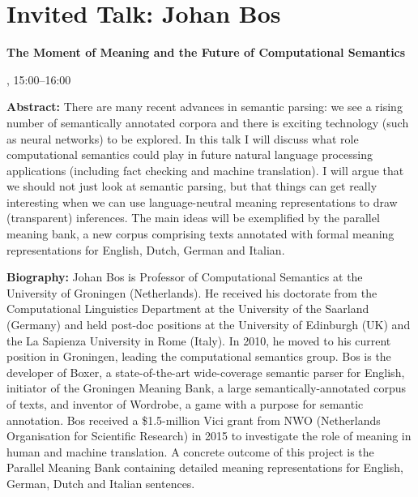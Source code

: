 \section{Invited Talk: Johan Bos}

\begin{center}
\begin{Large}
    {\bfseries\Large The Moment of Meaning and the Future of Computational Semantics} 
\vspace{1em}\par
\end{Large}

\daydateyear, 15:00--16:00 \vspace{1em}\\
\vspace{1em}\par
\end{center}

\noindent
{\bfseries Abstract:} There are many recent advances in semantic parsing: we see a rising number of semantically annotated corpora and there is exciting technology (such as neural networks) to be explored. In this talk I will discuss what role computational semantics could play in future natural language processing applications (including fact checking and machine translation). I will argue that we should not just look at semantic parsing, but that things can get really interesting when we can use language-neutral meaning representations to draw (transparent) inferences. The main ideas will be exemplified by the parallel meaning bank, a new corpus comprising texts annotated with formal meaning representations for English, Dutch, German and Italian.

\vspace{3em}\par 

\vfill
\noindent

{\bfseries Biography:} 
Johan Bos is Professor of Computational Semantics at the University of Groningen (Netherlands). He received his doctorate from the Computational Linguistics Department at the University of the Saarland (Germany) and held post-doc positions at the University of Edinburgh (UK) and the La Sapienza University in Rome (Italy). In 2010, he moved to his current position in Groningen, leading the computational semantics group. Bos is the developer of Boxer, a state-of-the-art wide-coverage semantic parser for English, initiator of the Groningen Meaning Bank, a large semantically-annotated corpus of texts, and inventor of Wordrobe, a game with a purpose for semantic annotation. Bos received a \$1.5-million Vici grant from NWO (Netherlands Organisation for Scientific Research) in 2015 to investigate the role of meaning in human and machine translation. A concrete outcome of this project is the Parallel Meaning Bank containing detailed meaning representations for English, German, Dutch and Italian sentences.

\newpage

